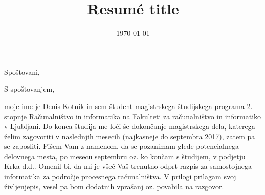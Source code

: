 \documentclass[11pt,a4paper,sans]{moderncv}        %
\title{Resumé title}                               %
\begin{document}
\date{\today}
\opening{Spoštovani,}
\closing{S spoštovanjem,}
\makelettertitle
moje ime je Denis Kotnik in sem študent magistrskega študijskega programa 2. stopnje Računalništvo in informatika na Fakulteti za računalništvo in informatiko v Ljubljani.
\newline
Do konca študija me loči še dokončanje magistrskega dela, katerega želim zagovoriti v naslednjih mesecih (najkasneje do septembra 2017), zatem pa se zaposliti.
\newline
\newline
Pišem Vam z namenom, da se pozanimam glede potencialnega delovnega mesta, po mesecu septembru oz. ko končam s študijem, v podjetju Krka d.d..
\newline
Omenil bi, da mi je všeč Vaš trenutno odprt razpis za samostojnega informatika za področje procesnega računalništva.
\newline
\newline
V prilogi prilagam svoj življenjepis, vesel pa bom dodatnih vprašanj oz. povabila na razgovor.
\newline
\newline

\makeletterclosing
\end{document}
